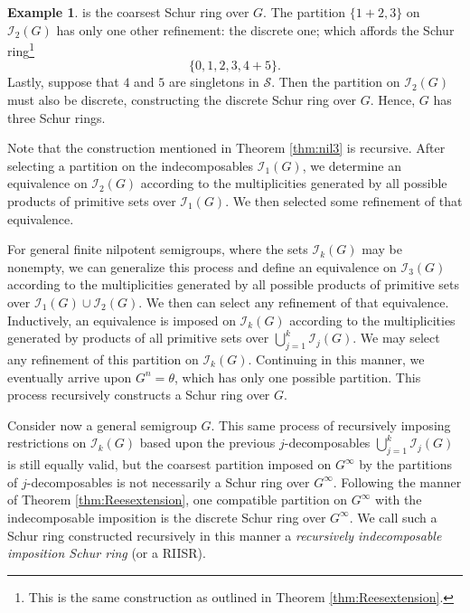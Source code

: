 \documentclass{article}
\theoremstyle{plain}
\theoremstyle{definition}
\newtheorem{Exam}[Thm]{Example}
\newcommand{\thmref}[1]{Theorem \ref{#1}}
\renewcommand{\S}{\mathcal{S}}
\newcommand{\I}{\mathscr{I}}
\begin{document}
\begin{Exam}
is the coarsest Schur ring over $G$. The partition $\{ 1+2, 3 \}$ on $\I_2(G)$ has only one other refinement: the discrete one; which affords the Schur ring\footnote{This is the same construction as outlined in \thmref{thm:Reesextension}.}
\[\{ 0, 1, 2, 3, 4+5 \}.\]   Lastly, suppose that $4$ and $5$ are singletons in $\S$. Then the partition on $\I_2(G)$ must also be discrete, constructing the discrete Schur ring over $G$. Hence, $G$ has three Schur rings.
\end{Exam}

Note that the construction mentioned in \thmref{thm:nil3} is recursive. After selecting a partition on the indecomposables $\I_1(G)$, we determine an equivalence on $\I_2(G)$ according to the multiplicities generated by all possible products of primitive sets over $\I_1(G)$. We then selected some refinement of that equivalence. 

For general finite nilpotent semigroups, where the sets $\I_k(G)$ may be nonempty, we can generalize this process and define an equivalence on $\I_3(G)$ according to the multiplicities generated by all possible products of primitive sets over $\I_1(G)\cup \I_2(G)$. We then can select any refinement of that equivalence. Inductively, an equivalence is imposed on $\I_k(G)$ according to the multiplicities generated by products of all primitive sets over $\bigcup_{j=1}^{k} \I_{j}(G)$. We may select any refinement of this partition on $\I_k(G)$. Continuing in this manner, we eventually arrive upon $G^n=\theta$, which has only one possible partition. This process recursively constructs a Schur ring over $G$.

Consider now a general semigroup $G$. This same process of recursively imposing restrictions on $\I_k(G)$ based upon the previous $j$-decomposables $\bigcup_{j=1}^{k}\I_j(G)$ is still equally valid, but the coarsest partition imposed on $G^\infty$ by the partitions of $j$-decomposables is not necessarily a Schur ring over $G^\infty$. Following the manner of \thmref{thm:Reesextension}, one compatible partition on $G^\infty$ with the indecomposable imposition is the discrete Schur ring over $G^\infty$.  We call such a Schur ring constructed recursively in this manner a \emph{recursively indecomposable imposition Schur ring} (or a RIISR). 
\end{document}
